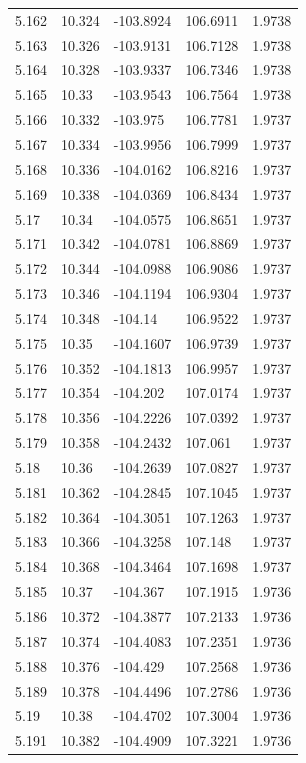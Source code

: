 \begin{tabular}{lllll}
5.162 & 10.324 & -103.8924 & 106.6911 & 1.9738 \\
5.163 & 10.326 & -103.9131 & 106.7128 & 1.9738 \\
5.164 & 10.328 & -103.9337 & 106.7346 & 1.9738 \\
5.165 & 10.33 & -103.9543 & 106.7564 & 1.9738 \\
5.166 & 10.332 & -103.975 & 106.7781 & 1.9737 \\
5.167 & 10.334 & -103.9956 & 106.7999 & 1.9737 \\
5.168 & 10.336 & -104.0162 & 106.8216 & 1.9737 \\
5.169 & 10.338 & -104.0369 & 106.8434 & 1.9737 \\
5.17 & 10.34 & -104.0575 & 106.8651 & 1.9737 \\
5.171 & 10.342 & -104.0781 & 106.8869 & 1.9737 \\
5.172 & 10.344 & -104.0988 & 106.9086 & 1.9737 \\
5.173 & 10.346 & -104.1194 & 106.9304 & 1.9737 \\
5.174 & 10.348 & -104.14 & 106.9522 & 1.9737 \\
5.175 & 10.35 & -104.1607 & 106.9739 & 1.9737 \\
5.176 & 10.352 & -104.1813 & 106.9957 & 1.9737 \\
5.177 & 10.354 & -104.202 & 107.0174 & 1.9737 \\
5.178 & 10.356 & -104.2226 & 107.0392 & 1.9737 \\
5.179 & 10.358 & -104.2432 & 107.061 & 1.9737 \\
5.18 & 10.36 & -104.2639 & 107.0827 & 1.9737 \\
5.181 & 10.362 & -104.2845 & 107.1045 & 1.9737 \\
5.182 & 10.364 & -104.3051 & 107.1263 & 1.9737 \\
5.183 & 10.366 & -104.3258 & 107.148 & 1.9737 \\
5.184 & 10.368 & -104.3464 & 107.1698 & 1.9737 \\
5.185 & 10.37 & -104.367 & 107.1915 & 1.9736 \\
5.186 & 10.372 & -104.3877 & 107.2133 & 1.9736 \\
5.187 & 10.374 & -104.4083 & 107.2351 & 1.9736 \\
5.188 & 10.376 & -104.429 & 107.2568 & 1.9736 \\
5.189 & 10.378 & -104.4496 & 107.2786 & 1.9736 \\
5.19 & 10.38 & -104.4702 & 107.3004 & 1.9736 \\
5.191 & 10.382 & -104.4909 & 107.3221 & 1.9736 \\

\end{tabular}
